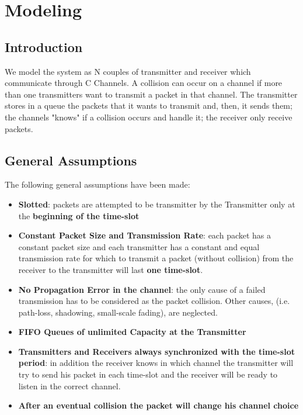 \section{Modeling}
\subsection{Introduction}
We model the system as N couples of transmitter and receiver which communicate through C Channels. A collision can occur on a channel if more than one transmitters want to transmit a packet in that channel. The transmitter stores in a queue the packets that it wants to transmit and, then, it sends them; the channels "knows" if a collision occurs and handle it; the receiver only receive packets.  
\subsection{General Assumptions}
The following general assumptions have been made:
\begin{itemize}
	\item \textbf{Slotted}: packets are attempted to be transmitter by the Transmitter only at the \textbf{beginning of the time-slot}
	\item \textbf{Constant Packet Size and Transmission Rate}: each packet has a constant packet size and each transmitter has a constant and equal transmission rate for which to transmit a packet (without collision) from the receiver to the transmitter will last \textbf{one time-slot}.
	\item \textbf{No Propagation Error in the channel}: the only cause of a failed transmission has to be considered as the packet collision. Other causes, (i.e. path-loss, shadowing, small-scale fading), are neglected. 
	\item \textbf{FIFO Queues of unlimited Capacity at the Transmitter} 
	\item \textbf{Transmitters and Receivers always synchronized with the time-slot period}: in addition the receiver knows in which channel the transmitter will try to send his packet in each time-slot and the receiver will be ready to listen in the correct channel.
	\item \textbf{After an eventual collision the packet will change his channel choice}
\end{itemize}

